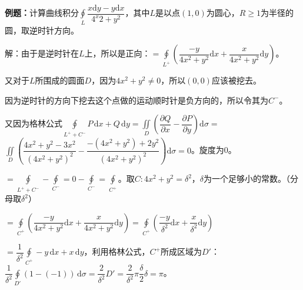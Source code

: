 \documentclass[UTF8, 12pt]{ctexart}
\begin{document}
\textbf{例题：}计算曲线积分$\oint\limits_L\dfrac{x\textrm{d}y-y\textrm{d}x}{4^x2+y^2}$，其中$L$是以点$(1,0)$为圆心，$R\geqslant1$为半径的圆，取逆时针方向。

解：由于是逆时针在$L$上，所以是正向：$=\displaystyle{\oint\limits_{L^+}\left(\dfrac{-y}{4x^2+y^2}\textrm{d}x+\dfrac{x}{4x^2+y^2}\textrm{d}y\right)}$。

又对于$L$所围成的圆面$D$，因为$4x^2+y^2\neq0$，所以$(0,0)$应该被挖去。

因为逆时针的方向下挖去这个点做的运动顺时针是负方向的，所以令其为$C^-$。

又因为格林公式$\oint\limits_{L^++C^-}P\,\textrm{d}x+Q\,\textrm{d}y=\displaystyle{\iint\limits_D\left(\dfrac{\partial Q}{\partial x}-\dfrac{\partial P}{\partial y}\right)\textrm{d}\sigma}=$\\$\displaystyle{\iint\limits_D\left(\dfrac{4x^2+y^2-3x^2}{(4x^2+y^2)^2}-\dfrac{-(4x^2+y^2)+2y^2}{(4x^2+y^2)^2}\right)\textrm{d}\sigma}=0$。旋度为0。

$=\oint\limits_{L^++C^-}-\oint\limits_{C^-}=0-\oint\limits_{C^-}=\oint\limits_{C^+}$。取$C:4x^2+y^2=\delta^2$，$\delta$为一个足够小的常数。（分母取$\delta^2$）

$=\displaystyle{\oint\limits_{C^+}\left(\dfrac{-y}{4x^2+y^2}\textrm{d}x+\dfrac{x}{4x^2+y^2}\textrm{d}y\right)}=\displaystyle{\oint\limits_{C^+}\left(\dfrac{-y}{\delta^2}\textrm{d}x+\dfrac{x}{\delta^2}\textrm{d}y\right)}$

$=\dfrac{1}{\delta^2}\oint\limits_{C^+}-y\,\textrm{d}x+x\,\textrm{d}y$，利用格林公式，$C^+$所成区域为$D'$：$\dfrac{1}{\delta^2}\oint\limits_{D'}(1-(-1))\,\textrm{d}\sigma=\dfrac{2}{\delta^2}D'=\dfrac{2}{\delta^2}\pi\dfrac{\delta}{2}\delta=\pi$。
\end{document}
